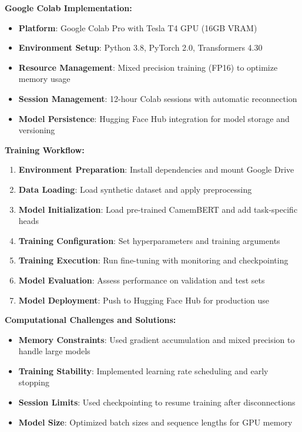 \documentclass[12pt,a4paper]{article}
\begin{document}
\textbf{Google Colab Implementation:}
\begin{itemize}
    \item \textbf{Platform}: Google Colab Pro with Tesla T4 GPU (16GB VRAM)
    \item \textbf{Environment Setup}: Python 3.8, PyTorch 2.0, Transformers 4.30
    \item \textbf{Resource Management}: Mixed precision training (FP16) to optimize memory usage
    \item \textbf{Session Management}: 12-hour Colab sessions with automatic reconnection
    \item \textbf{Model Persistence}: Hugging Face Hub integration for model storage and versioning
\end{itemize}

\textbf{Training Workflow:}
\begin{enumerate}
    \item \textbf{Environment Preparation}: Install dependencies and mount Google Drive
    \item \textbf{Data Loading}: Load synthetic dataset and apply preprocessing
    \item \textbf{Model Initialization}: Load pre-trained CamemBERT and add task-specific heads
    \item \textbf{Training Configuration}: Set hyperparameters and training arguments
    \item \textbf{Training Execution}: Run fine-tuning with monitoring and checkpointing
    \item \textbf{Model Evaluation}: Assess performance on validation and test sets
    \item \textbf{Model Deployment}: Push to Hugging Face Hub for production use
\end{enumerate}

\textbf{Computational Challenges and Solutions:}
\begin{itemize}
    \item \textbf{Memory Constraints}: Used gradient accumulation and mixed precision to handle large models
    \item \textbf{Training Stability}: Implemented learning rate scheduling and early stopping
    \item \textbf{Session Limits}: Used checkpointing to resume training after disconnections
    \item \textbf{Model Size}: Optimized batch sizes and sequence lengths for GPU memory
\end{itemize}
\end{document}
